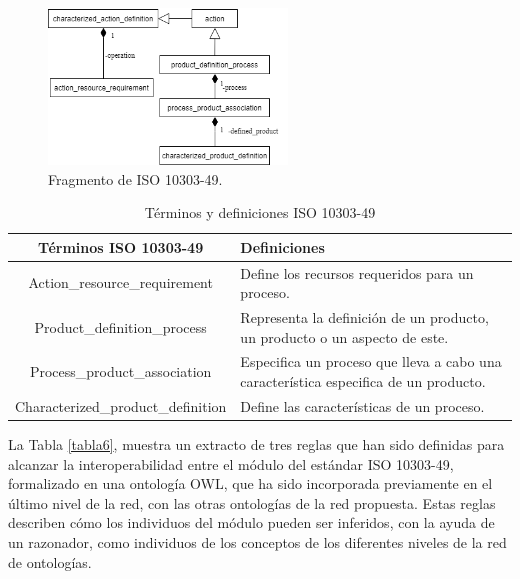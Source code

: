 \documentclass[journal]{IEEEtran}
\begin{document}
\begin{figure}[!t]
\centering
\includegraphics[width=2.5in]{figures/figure9.png}
\caption{Fragmento de ISO 10303-49.}
\label{fig9}
\end{figure}

\begin{table}[!t]
\renewcommand{\arraystretch}{1.3}
\caption{T\'erminos y definiciones ISO 10303-49}
\label{tabla5}
\centering
\begin{tabular}{cp{4cm}}
\hline
\hline
 T\'erminos ISO 10303-49 &  Definiciones \\
\hline
Action\_resource\_requirement & Define los recursos requeridos para un proceso. \\ \cline{1-2}
Product\_definition\_process & Representa la definici\'on de un producto, un producto o un aspecto de este. \\ \cline{1-2}
Process\_product\_association & Especifica un proceso que lleva a cabo una caracter\'istica especifica de un producto. \\  \cline{1-2}
Characterized\_product\_definition & Define las caracter\'isticas de un proceso. \\
\hline \hline
\end{tabular}
\end{table}

La Tabla \ref{tabla6}, muestra un extracto de tres reglas que han sido definidas para alcanzar la interoperabilidad entre el m\'odulo del est\'andar ISO 10303-49, formalizado en una ontolog\'ia OWL, que ha sido incorporada previamente en el \'ultimo nivel de la red, con las otras ontolog\'ias de la red propuesta. Estas reglas describen c\'omo los individuos del m\'odulo pueden ser inferidos, con la ayuda de un razonador, como individuos de los conceptos de los diferentes niveles de la red de ontolog\'ias.
\end{document}
